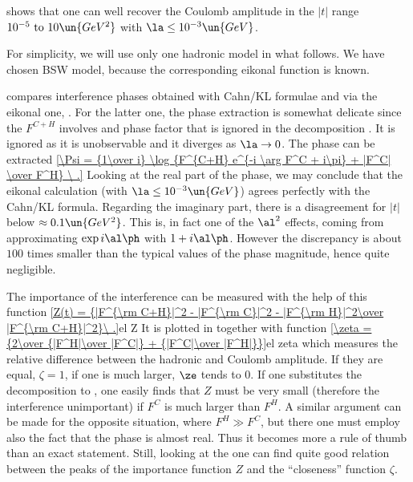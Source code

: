  shows that one can well recover the Coulomb amplitude in the $|t|$ range $10^{-5}\hbox{ to } 10\un{GeV^2}$ with $\la \le 10^{-3}\un{GeV}$.


For simplicity, we will use only one hadronic model in what follows. We have chosen BSW model, because the corresponding eikonal function is known.

 compares interference phases obtained with Cahn/KL formulae and via the eikonal one, . For the latter one, the phase extraction is somewhat delicate since the $F^{C+H}$ involves and phase factor that is ignored in the decomposition . It is ignored as it is unobservable and it diverges as $\la\to 0$. The phase can be extracted
\eqref{\Psi = {1\over i} \log {F^{C+H} e^{-i \arg F^C + i\pi} + |F^C| \over F^H} \ .}{}
Looking at the real part of the phase, we may conclude that the eikonal calculation (with $\la \le 10^{-3}\un{GeV}$) agrees perfectly with the Cahn/KL formula. Regarding the imaginary part, there is a disagreement for $|t|$ below $\approx 0.1\un{GeV^2}$. This is, in fact one of the $\al^2$ effects, coming from approximating $\exp i\al\ph$ with $1+i\al\ph$. However the discrepancy is about $100$ times smaller than the typical values of the phase magnitude, hence quite negligible.


The importance of the interference can be measured with the help of this function
\eqref{Z(t) = {|F^{\rm C+H}|^2 - |F^{\rm C}|^2 - |F^{\rm H}|^2\over |F^{\rm C+H}|^2}\ .}{el Z}
It is plotted in  together with function
\eqref{\zeta = {2\over {|F^H|\over |F^C|} + {|F^C|\over |F^H|}}}{el zeta}
which measures the relative difference between the hadronic and Coulomb amplitude. If they are equal, $\zeta = 1$, if one is much larger, $\ze$ tends to $0$. If one substitutes the decomposition  to , one easily finds that $Z$ must be very small (therefore the interference unimportant) if $F^C$ is much larger than $F^H$. A similar argument can be made for the opposite situation, where $F^H \gg F^C$, but there one must employ also the fact that the phase is almost real. Thus it becomes more a rule of thumb than an exact statement. Still, looking at the  one can find quite good relation between the peaks of the importance function $Z$ and the ``closeness'' function $\zeta$.

